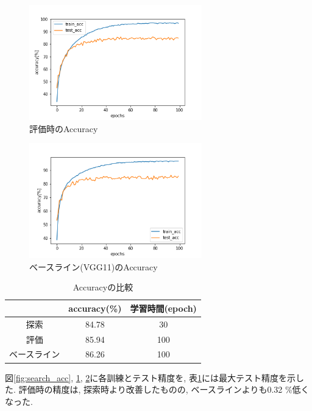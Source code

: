 \documentclass[twocolumn]{jarticle}     %
\begin{document}
\begin{figure}[tb]
	\begin{center}
		\includegraphics[clip,width=75mm]{eval_acc.png}
		\caption{評価時のAccuracy}
		\label{fig:eval_acc}
	\end{center}
\end{figure}

\begin{figure}[tb]
	\begin{center}
		\includegraphics[clip,width=75mm]{baseline_acc.png}
		\caption{ベースライン(VGG11)のAccuracy}
		\label{fig:baseline_acc}
	\end{center}
\end{figure}

\begin{table}[tb]
  \begin{center}
    \caption{Accuracyの比較}
    \begin{tabular}{|c||c|c|} \hline
       & accuracy(\%) & 学習時間(epoch) \\ \hline \hline
      探索 & 84.78 & 30 \\ \hline
      評価 & 85.94 & 100 \\ \hline
      ベースライン & 86.26 & 100 \\ \hline
    \end{tabular}
    \label{tab:dist}
  \end{center}
\end{table}

図\ref{fig:search_acc}, \ref{fig:eval_acc}, \ref{fig:baseline_acc}に各訓練とテスト精度を,
表\ref{tab:dist}には最大テスト精度を示した.
評価時の精度は, 探索時より改善したものの, ベースラインよりも0.32 \%低くなった.
\end{document}
